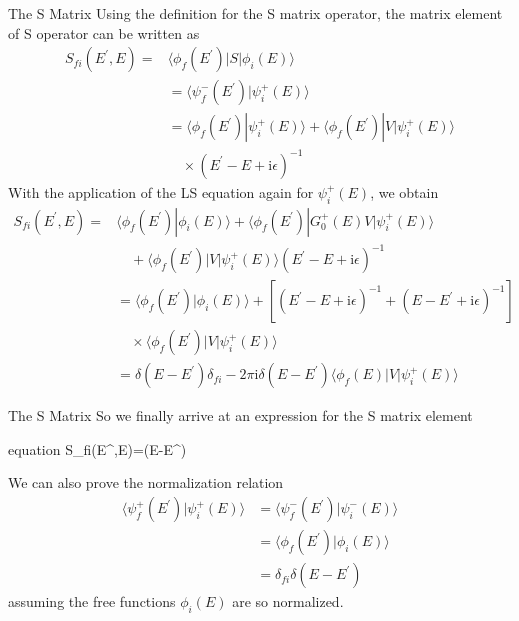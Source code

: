 \documentclass{beamer}
\begin{document}
	\begin{frame}{The S Matrix}
		Using the definition for the S matrix operator, the matrix element of S operator can be written as
		\begin{align}
			S_{fi}(E^\prime,E)=&\langle\phi_f(E^\prime)|S|\phi_i(E)\rangle\nonumber\\
			&=\langle\psi^-_f(E^\prime)|\psi_i^+(E)\rangle\nonumber\\
			&=\langle\phi_f(E^\prime)|\psi^+_i(E)\rangle+\langle\phi_f(E^\prime)|V|\psi^+_i(E)\rangle\nonumber\\
			&\quad\times(E^\prime-E+\mathrm{i}\epsilon)^{-1}
		\end{align}
		With the application of the LS equation again for $\psi_i^+(E)$, we obtain
		\begin{align}
			S_{fi}(E^\prime,E)=&\langle\phi_f(E^\prime)|\phi_i(E)\rangle+\langle\phi_f(E^\prime)|G_0^+(E)V|\psi_i^+(E)\rangle\nonumber\\
			&\quad+\langle\phi_f(E^\prime)|V|\psi_i^+(E)\rangle(E^\prime-E+\mathrm{i}\epsilon)^{-1}\nonumber\\
			&=\langle\phi_f(E^\prime)|\phi_i(E)\rangle+\left[ (E^\prime-E+\mathrm{i}\epsilon)^{-1}+(E-E^\prime+\mathrm{i}\epsilon)^{-1}\right] \nonumber\\
			&\quad\times\langle\phi_f(E^\prime)|V|\psi_i^+(E)\rangle\nonumber\\
			&=\delta(E-E^\prime)\delta_{fi}-2\pi\mathrm{i}\delta(E-E^\prime)\langle\phi_f(E)|V|\psi_i^+(E)\rangle
		\end{align}
	\end{frame}
	\begin{frame}{The S Matrix}
		So we finally arrive at an expression for the S matrix element
		\begin{empheq}[box=\fbox]{equation}
			S_{fi}(E^\prime,E)=\delta(E-E^\prime) 
		\end{empheq}
		We can also prove the normalization relation
		\begin{align}
			\langle\psi_f^+(E^\prime)|\psi_i^+(E)\rangle&=\langle\psi_f^-(E^\prime)|\psi_i^-(E)\rangle\nonumber\\
			&=\langle\phi_f(E^\prime)|\phi_i(E)\rangle\nonumber\\
			&=\delta_{fi}\delta(E-E^\prime)
		\end{align}
		assuming the free functions $\phi_i(E)$ are so normalized.
	\end{frame}
\end{document}
